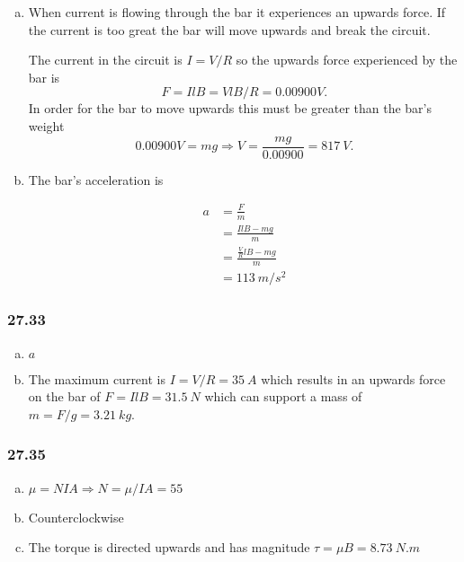 \documentclass{article}
\begin{document}
\begin{enumerate}[(a)]
  \item When current is flowing through the bar it experiences an upwards force. If the current is too great the bar will move upwards and break the circuit.

        The current in the circuit is $I = V / R$ so the upwards force experienced by the bar is \[F = I l B = V l B / R = 0.00900 V.\] In order for the bar to move upwards this must be greater than the bar's weight \[0.00900 V = m g \Rightarrow V = \frac{m g}{0.00900} = \qty{817}{V}.\]

  \item The bar's acceleration is

        \begin{align*}
          a & = \frac{F}{m}                     \\
            & = \frac{I l B - m g}{m}           \\
            & = \frac{\frac{V}{R} l B - m g}{m} \\
            & = \qty{113}{m/s^2}
        \end{align*}
\end{enumerate}

\subsubsection{27.33}

\begin{enumerate}[(a)]
  \item $a$

  \item The maximum current is $I = V / R = \qty{35}{A}$ which results in an upwards force on the bar of $F = I l B = \qty{31.5}{N}$ which can support a mass of $m = F / g = \qty{3.21}{kg}$.
\end{enumerate}

\subsubsection{27.35}

\begin{enumerate}[(a)]
  \item $\mu = N I A \Rightarrow N = \mu / I A = 55$

  \item Counterclockwise

  \item The torque is directed upwards and has magnitude $\tau = \mu B = \qty{8.73}{N.m}$
\end{enumerate}
\end{document}
